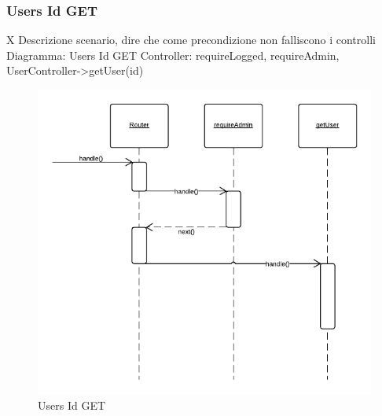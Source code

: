 \subsubsection{Users Id GET} X 
Descrizione scenario, dire che come precondizione non falliscono i controlli
Diagramma: Users Id GET
Controller: requireLogged, requireAdmin, UserController->getUser(id)
\begin{figure}[H]
	\begin{center} 
		\includegraphics[scale=0.60]{scenari/Users Id GET.png} 
		\caption{Users Id GET}
	\end{center} 
\end{figure}

